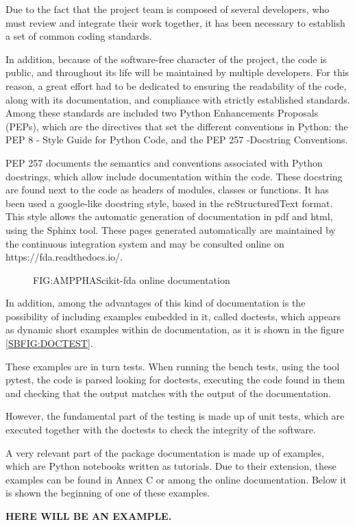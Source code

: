 Due to the fact that the project team is composed of several developers, who
must review and integrate their work together, it has been necessary to
establish a set of common coding standards.

In addition, because of the software-free character of the project, the code is
public, and throughout its life will be maintained by multiple developers. For
this reason, a great effort had to be dedicated to ensuring the readability of
the code, along with its documentation, and compliance with strictly established
standards. Among these standards are included two Python Enhancements Proposals
(PEPs), which are the directives that set the different conventions in Python:
the PEP 8 - Style Guide for Python Code, and the PEP 257 -Docstring Conventions.

PEP 257 documents the semantics and conventions associated with Python
docstrings, which allow include documentation within the code. These docstring
are found next to the code as headers of modules, classes or functions. It has
been used a google-like docstring style, based in the reStructuredText format.
This style allows the automatic generation of documentation in pdf and html,
using the Sphinx tool. These pages generated automatically are maintained by
the continuous integration system and may be consulted online on
https://fda.readthedocs.io/.

\begin{figure}[Scikit-fda online documentation]{FIG:AMPPHA}{Scikit-fda online documentation}
   \quad
\end{figure}

In addition, among the advantages of this kind of documentation is the
possibility of including examples embedded in it, called doctests, which appears
 as dynamic short examples within de documentation, as it is shown in the
 figure \ref{SBFIG:DOCTEST}.

These examples are in turn tests. When running the bench tests, using the tool
pytest, the code is parsed looking for doctests, executing the code found in
them and checking that the output matches with the output of the documentation.

However, the fundamental part of the testing is made up of unit tests, which are
executed together with the doctests to check the integrity of the software.

A very relevant part of the package documentation is made up of examples,
which are Python notebooks written as tutorials. Due to their extension, these
examples can be found in Annex C or among the online documentation. Below it is
shown the beginning of one of these examples.

\textbf{HERE WILL BE AN EXAMPLE.}
